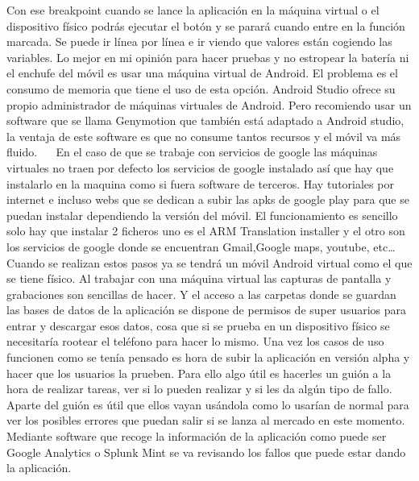 Con ese breakpoint cuando se lance la aplicación en la máquina virtual o el dispositivo físico podrás ejecutar el botón y se parará cuando entre en la función marcada. Se puede ir línea por línea e ir viendo que valores están cogiendo las variables.
Lo mejor en mi opinión para hacer pruebas y no estropear la batería ni el enchufe del móvil es usar una máquina virtual de Android. El problema es el consumo de memoria que tiene el uso de esta opción. Android Studio ofrece su propio administrador de máquinas virtuales de Android. Pero recomiendo usar un software que se llama Genymotion que también está adaptado a Android studio, la ventaja de este software es que no consume tantos recursos y el móvil va más fluido.
 
En el caso de que se trabaje con servicios de google las máquinas virtuales no traen por defecto los servicios de google instalado así que hay que instalarlo en la maquina como si fuera software de terceros. Hay tutoriales por internet e incluso webs que se dedican a subir las apks de google play para que se puedan instalar dependiendo la versión del móvil.
El funcionamiento es sencillo solo hay que instalar 2 ficheros uno es el ARM Translation installer y el otro son los servicios de google donde se encuentran Gmail,Google maps, youtube, etc…
Cuando se realizan estos pasos ya se tendrá un móvil Android virtual como el que se tiene físico.
Al trabajar con una máquina virtual las capturas de pantalla y grabaciones son sencillas de hacer. Y el acceso a las carpetas donde se guardan las bases de datos de la aplicación se dispone de permisos de super usuarios para entrar y descargar esos datos, cosa que si se prueba en un dispositivo físico se necesitaría rootear el teléfono para hacer lo mismo.
Una vez los casos de uso funcionen como se tenía pensado es hora de subir la aplicación en versión alpha y hacer que los usuarios la prueben.
Para ello algo útil es hacerles un guión a la hora de realizar tareas, ver si lo pueden realizar y si les da algún tipo de fallo.
Aparte del guión es útil que ellos vayan usándola como lo usarían de normal para ver los posibles errores que puedan salir si se lanza al mercado en este momento.
Mediante software que recoge la información de la aplicación como puede ser Google Analytics o Splunk Mint se va revisando los fallos que puede estar dando la aplicación.

